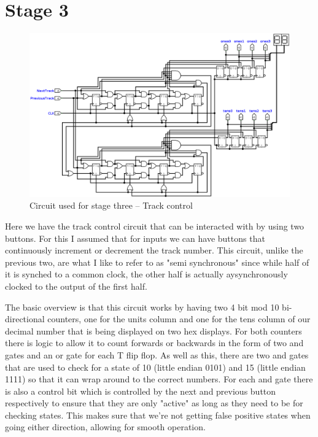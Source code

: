 \documentclass[11pt]{scrartcl}
\begin{document}
\pagebreak

\section*{Stage 3}
\begin{figure}[h]
    \centering
    \includegraphics[scale=0.3]{images/stagethree.png}
    \caption{Circuit used for stage three -- Track control}
\end{figure}
Here we have the track control circuit that can be interacted with by using two buttons. For
this I assumed that for inputs we can have buttons that continuously increment or decrement the
track number. This circuit, unlike the previous two, are what I like to refer to as "semi
synchronous" since while half of it is synched to a common clock, the other half is actually
aysynchronously clocked to the output of the first half.

\bigskip

The basic overview is that this circuit works by having two 4 bit mod 10 bi-directional
counters, one for the units column and one for the tens column of our decimal number that is
being displayed on two hex displays. For both counters there is logic to allow it to count
forwards or backwards in the form of two and gates and an or gate for each T flip flop. As well
as this, there are two and gates that are used to check for a state of 10 (little endian 0101) and
15 (little endian 1111) so that it can wrap around to the correct numbers. For each and gate there
is also a control bit which is controlled by the next and previous button respectively to ensure
that they are only "active" as long as they need to be for checking states. This makes sure that
we're not getting false positive states when going either direction, allowing for smooth operation.
\end{document}
